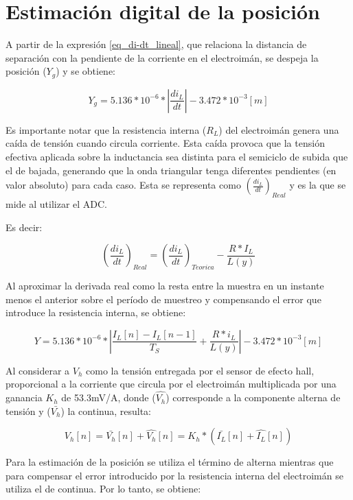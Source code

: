 \section{Estimación digital de la posición}

A partir de la expresión \ref{eq_di-dt_lineal}, que relaciona la distancia de separación con la pendiente de la corriente en el electroimán, se despeja la posición ($Y_g$) y se obtiene:

\begin{equation} 
	Y_g = 5.136*10^{-6}*|\frac{di_L}{dt}|- 3.472*10^{-3} [m]
\end{equation}

\noindent Es importante notar que la resistencia interna ($R_L$) del electroimán genera una caída de tensión cuando circula corriente. Esta caída provoca que la tensión efectiva aplicada sobre la inductancia sea distinta para el semiciclo de subida que el de bajada, generando que la onda triangular tenga diferentes pendientes (en valor absoluto) para cada caso. Esta se representa como $(\frac{di_L}{dt})_{Real}$ y es la que se mide al utilizar el ADC.

\noindent Es decir:

\begin{equation} 
	(\frac{di_L}{dt})_{Real}=(\frac{di_L}{dt})_{Teorica}-\frac{R*I_L}{L(y)}
\end{equation}

\noindent Al aproximar la derivada real como la resta entre la muestra en un instante menos el anterior sobre el período de muestreo y compensando el error que introduce la resistencia interna, se obtiene:

\begin{equation} 
	Y = 5.136*10^{-6}* |\frac{I_L[n]-I_L[n-1]}{T_S}+\frac{R*i_L}{L(y)}| - 3.472*10^{-3} [m]
\end{equation}


\noindent Al considerar a $V_h$ como la tensión entregada por el sensor de efecto hall, proporcional a la corriente que circula por el electroimán multiplicada por una ganancia $K_h$ de 53.3mV/A, donde  ($\hat{V_h}$)  corresponde a la componente alterna de tensión y ($\bar{V_h}$) la continua, resulta:


\begin{equation} 
	V_h[n] = \bar{V_h}[n] + \hat{V_h}[n] = K_h * (\bar{I_L}[n] + \hat{I_L}[n])
\end{equation}

\noindent Para la estimación de la posición se utiliza el término de alterna mientras que para compensar el error introducido por la resistencia interna del electroimán se utiliza el de continua. Por lo tanto, se obtiene:


